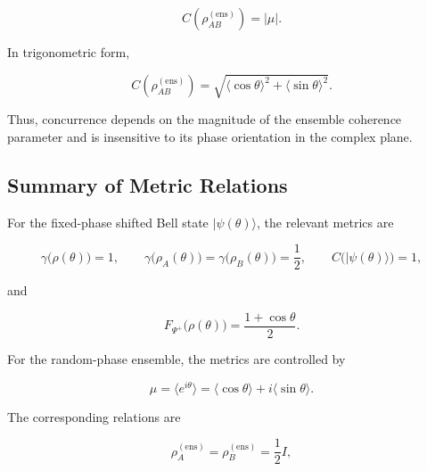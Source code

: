\begin{equation}
C\left(\rho_{AB}^{(\mathrm{ens})}\right)
=
|\mu|.
\label{eq:d5_random_phase_ensemble_concurrence_mu}
\end{equation}

In trigonometric form,

\begin{equation}
C\left(\rho_{AB}^{(\mathrm{ens})}\right)
=
\sqrt{
\langle\cos\theta\rangle^2
+
\langle\sin\theta\rangle^2
}.
\label{eq:d5_random_phase_ensemble_concurrence_trigonometric}
\end{equation}

Thus, concurrence depends on the magnitude of the ensemble coherence parameter and is insensitive to its phase orientation in the complex plane.


\subsection{Summary of Metric Relations}

For the fixed-phase shifted Bell state \( |\psi(\theta)\rangle \), the relevant metrics are

\begin{equation}
\gamma\big(\rho(\theta)\big)=1,
\qquad
\gamma\big(\rho_A(\theta)\big)=\gamma\big(\rho_B(\theta)\big)=\frac{1}{2},
\qquad
C\big(|\psi(\theta)\rangle\big)=1,
\label{eq:d5_fixed_phase_metric_summary_first}
\end{equation}

and

\begin{equation}
F_{\Psi^+}\big(\rho(\theta)\big)
=
\frac{1+\cos\theta}{2}.
\label{eq:d5_fixed_phase_metric_summary_second}
\end{equation}

For the random-phase ensemble, the metrics are controlled by

\begin{equation}
\mu
=
\langle e^{i\theta}\rangle
=
\langle\cos\theta\rangle+i\langle\sin\theta\rangle.
\label{eq:d5_metric_summary_mu}
\end{equation}

The corresponding relations are

\begin{equation}
\rho_A^{(\mathrm{ens})}
=
\rho_B^{(\mathrm{ens})}
=
\frac{1}{2}I,
\label{eq:d5_metric_summary_reduced_states}
\end{equation}

